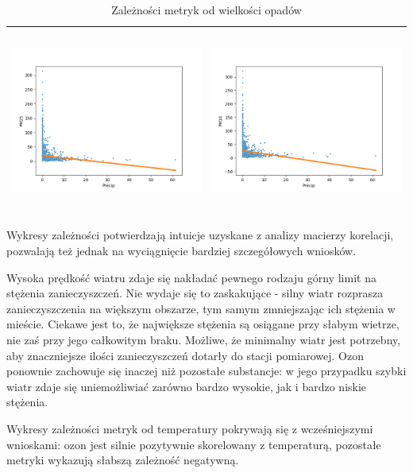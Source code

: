 \documentclass[18pt, letterpaper]{article}
\begin{document}
\begin{table}[H]
\begin{tabular}{|c|c|}
\includegraphics[width=80mm,height=60mm]{visualisations/corr_plots/precipxPM25_scatter.png}  & \includegraphics[width=80mm,height=60mm]{visualisations/corr_plots/precipxPM10_scatter.png} \\ \hline
\end{tabular}
\caption{Zależności metryk od wielkości opadów}
\label{table:precipitation}
\end{table}

Wykresy zależności potwierdzają intuicje uzyskane z analizy macierzy korelacji, pozwalają też jednak na wyciągnięcie bardziej szczegółowych wniosków.

Wysoka prędkość wiatru zdaje się nakładać pewnego rodzaju górny limit na stężenia zanieczyszczeń. Nie wydaje się to zaskakujące - silny wiatr rozprasza zanieczyszczenia na większym obszarze, tym samym zmniejszając ich stężenia w mieście. Ciekawe jest to, że największe stężenia są osiągane przy słabym wietrze, nie zaś przy jego całkowitym braku. Możliwe, że minimalny wiatr jest potrzebny, aby znaczniejsze ilości zanieczyszczeń dotarły do stacji pomiarowej. Ozon ponownie zachowuje się inaczej niż pozostałe substancje: w jego przypadku szybki wiatr zdaje się uniemożliwiać zarówno bardzo wysokie, jak i bardzo niskie stężenia.

Wykresy zależności metryk od temperatury pokrywają się z wcześniejszymi wnioskami: ozon jest silnie pozytywnie skorelowany z temperaturą, pozostałe metryki wykazują słabszą zależność negatywną.
\end{document}
